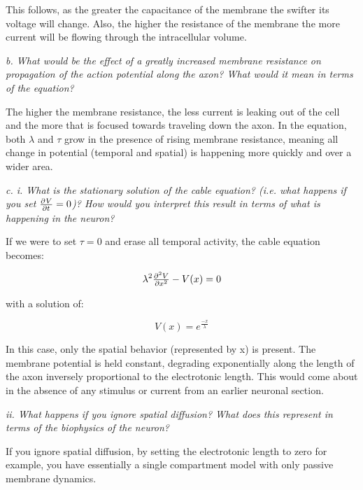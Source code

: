 \documentclass[12pt]{article}
\begin{document}
This follows, as the greater the capacitance of the membrane the swifter its voltage will change.  Also, the higher the resistance of the membrane the more current will be flowing through the intracellular volume.

\vspace{10pt}

\emph{b.  What would be the effect of a greatly increased membrane resistance on propagation of the action potential along the axon? What would it mean in terms of the equation?}

\vspace{10pt}

The higher the membrane resistance, the less current is leaking out of the cell and the more that is focused towards traveling down the axon.  In the equation, both $\lambda$ and $\tau$ grow in the presence of rising membrane resistance, meaning all change in potential (temporal and spatial) is happening more quickly and over a wider area.

\vspace{10pt}

\emph{c.  i.  What is the stationary solution of the cable equation? (i.e. what happens if you set $\pd{V}{t} = 0$)?  How would you interpret this result in terms of what is happening in the neuron?}

\vspace{10pt}

If we were to set $\tau=0$ and erase all temporal activity, the cable equation becomes:

$$ \lambda^2\pd[2]{V}{x}-V(x)=0 $$

with a solution of:

$$ V(x)=e^{\frac{-x}{\lambda}} $$

In this case, only the spatial behavior (represented by x) is present.  The membrane potential is held constant, degrading exponentially along the length of the axon inversely proportional to the electrotonic length.  This would come about in the absence of any stimulus or current from an earlier neuronal section.

\vspace{10pt}

\emph{    ii.  What happens if you ignore spatial diffusion? What does this represent in terms of the biophysics of the neuron?}

\vspace{10pt}

If you ignore spatial diffusion, by setting the electrotonic length to zero for example, you have essentially a single compartment model with only passive membrane dynamics.  
\end{document}
